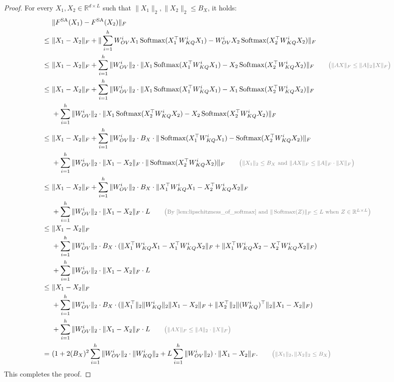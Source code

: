 \documentclass[12pt]{article}
\numberwithin{equation}{section}
\newcommand{\Softmax}{\mathop{{\rm Softmax}}}
\def\R{\mathbb{R}}
\theoremstyle{theoremstyle}
\numberwithin{equation}{section}
\numberwithin{theorem}{section}
\numberwithin{proposition}{section}
\numberwithin{definition}{section}
\numberwithin{lemma}{section}
\numberwithin{assumption}{section}
\numberwithin{remark}{section}
\newcommand*{\annot}[1]{\tag*{\footnotesize{\textcolor{black!50}{\big(#1\big)}}}}
\begin{document}
\begin{proof}
For every $X_1,X_2\in\R^{d\times L}$ such that $\|X_1\|_2,\|X_2\|_2\leq B_X$, it holds:
\begin{align*}
    & ~ \|F^{\rm SA}(X_1)-F^{\rm SA}(X_2)\|_F \\
    \leq & ~
    \|X_1-X_2\|_F+\|\sum_{i=1}^h W_{OV}^iX_1\Softmax(X_1^\top W_{KQ}^iX_1)-W_{OV}^iX_2\Softmax(X_2^\top W_{KQ}^iX_2)\|_F \\
    \leq & ~
    \|X_1-X_2\|_F+\sum_{i=1}^h\|W_{OV}^i\|_2\cdot\|X_1\Softmax(X_1^\top W_{KQ}^iX_1)-X_2\Softmax(X_2^\top W_{KQ}^iX_2)\|_F 
    \annot{$\|AX\|_F\leq\|A\|_2\|X\|_F$} \\
    \leq & ~
    \|X_1-X_2\|_F+\sum_{i=1}^h\|W_{OV}^i\|_2\cdot\|X_1\Softmax(X_1^\top W_{KQ}^iX_1)-X_1\Softmax(X_2^\top W_{KQ}^iX_2)\|_F \\
    & ~ +
    \sum_{i=1}^h\|W_{OV}^i\|_2\cdot\|X_1\Softmax(X_2^\top W_{KQ}^iX_2)-X_2\Softmax(X_2^\top W_{KQ}^iX_2)\|_F \\
    \leq & ~
    \|X_1-X_2\|_F+\sum_{i=1}^h\|W_{OV}^i\|_2\cdot B_X\cdot\|\Softmax(X_1^\top W_{KQ}^iX_1)-\Softmax(X_2^\top W_{KQ}^iX_2)\|_F \\
    & ~ +
    \sum_{i=1}^h\|W_{OV}^i\|_2\cdot\|X_1-X_2\|_F\cdot\|\Softmax(X_2^\top W_{KQ}^iX_2)\|_F 
    \annot{$\|X_1\|_2\leq B_X$ and $\|AX\|_F\leq\|A\|_F\cdot\|X\|_F$}\\
    \leq & ~
    \|X_1-X_2\|_F+\sum_{i=1}^h\|W_{OV}^i\|_2\cdot B_X\cdot\|X_1^\top W_{KQ}^iX_1-X_2^\top W_{KQ}^iX_2\|_F \\
    & ~ +
    \sum_{i=1}^h\|W_{OV}^i\|_2\cdot\|X_1-X_2\|_F\cdot L 
    \annot{By \cref{lem:lipschitzness_of_softmax} and $\|\Softmax(Z)\|_F\leq L$ when $Z\in\R^{L\times L}$}\\
    \leq & ~
    \|X_1-X_2\|_F\\
    & ~ +\sum_{i=1}^h\|W_{OV}^i\|_2\cdot B_X\cdot(\|X_1^\top W_{KQ}^iX_1-X_1^\top W_{KQ}^iX_2\|_F+\|X_1^\top W_{KQ}^iX_2-X_2^\top W_{KQ}^iX_2\|_F) \\
    & ~ +
    \sum_{i=1}^h\|W_{OV}^i\|_2\cdot\|X_1-X_2\|_F\cdot L \\
    \leq & ~
    \|X_1-X_2\|_F\\
    & ~ +\sum_{i=1}^h\|W_{OV}^i\|_2\cdot B_X\cdot(\|X_1^\top\|_2 \|W_{KQ}^i\|_2 \|X_1-X_2\|_F+\|X_2^\top\|_2 \|(W_{KQ}^i)^\top\|_2 \|X_1-X_2\|_F) \\
    & ~ +
    \sum_{i=1}^h\|W_{OV}^i\|_2\cdot\|X_1-X_2\|_F\cdot L
    \annot{$\|AX\|_F\leq\|A\|_2\cdot\|X\|_F$}\\
    = & ~
    (1+2(B_X)^2\sum_{i=1}^h\|W^i_{OV}\|_2\cdot\|W^i_{KQ}\|_2+L\sum_{i=1}^h\|W^i_{OV}\|_2)\cdot\|X_1-X_2\|_F.
    \annot{$\|X_1\|_2,\|X_2\|_2\leq B_X$}
\end{align*}
This completes the proof.
\end{proof}
\end{document}

